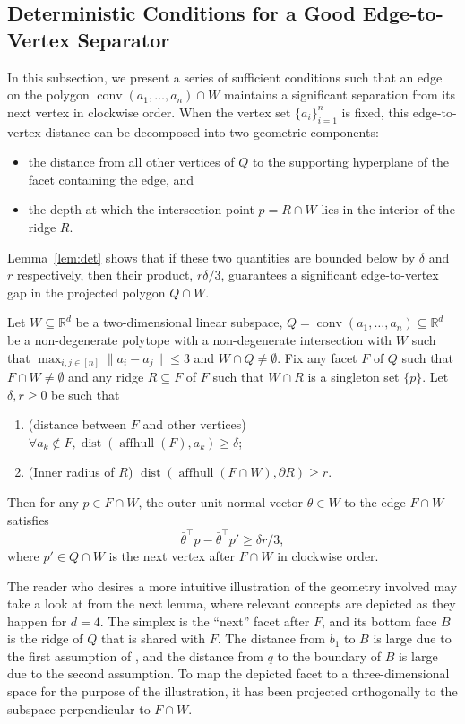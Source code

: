\documentclass{article}\usepackage[a4paper,margin=20mm]{geometry}
\newcommand{\R}{\mathbb R}
\newcommand{\T}{\top}
\newcommand{\aff}{\operatorname{affhull}}
\newcommand{\conv}{\operatorname{conv}}
\newcommand{\dist}{\operatorname{dist}}
\renewcommand{\subset}{\subseteq}
\begin{document}
\subsection{Deterministic Conditions for a Good Edge-to-Vertex Separator} \label{sub:det}


In this subsection, we present a series of sufficient conditions such that an edge on the polygon $\conv(a_1, \ldots, a_n) \cap W$ maintains a significant separation from its next vertex in clockwise order. When the vertex set $\{a_i\}_{i=1}^n$ is fixed, this edge-to-vertex distance can be decomposed into two geometric components:
\begin{itemize}
    \item the distance from all other vertices of $Q$ to the supporting hyperplane of the facet containing the edge, and
    \item the depth at which the intersection point $p = R \cap W$ lies in the interior of the ridge $R$.
\end{itemize}
Lemma~\ref{lem:det} shows that if these two quantities are bounded below by $\delta$ and $r$ respectively, then their product, $r\delta/3$, guarantees a significant edge-to-vertex gap in the projected polygon $Q \cap W$.



\begin{lemma}\label{lem:det}
Let $W \subset \R^d$ be a two-dimensional linear subspace,
$Q = \conv(a_1, \ldots, a_n) \subset \R^d$ be a non-degenerate polytope
with a non-degenerate intersection with $W$
such that $\max_{i, j\in [n]} \|a_i - a_j\| \leq 3$ and $W \cap Q \neq \emptyset$.
Fix any facet $F$ of $Q$ such that $F \cap W \neq \emptyset$
and any ridge $R \subset F$ of $F$ such that $W \cap R$ is a singleton set $\{p\}$.
Let $\delta, r \geq 0$ be such that
\begin{enumerate}
    \item (distance between $F$ and other vertices) $\forall a_k \notin F, \dist(\aff(F), a_k) \geq \delta$;
    \item (Inner radius of $R$) $\dist(\aff(F \cap W), \partial R) \geq r$.
\end{enumerate}
Then for any $p \in F \cap W$, the outer unit normal vector $\bar{\theta} \in W$
to the edge $F \cap W$ satisfies
\[
\bar{\theta}^\T p - \bar{\theta}^\top p' \geq \delta r/3,
\]
where $p' \in Q \cap W$ is the next vertex after $F \cap W$ in clockwise order.
\end{lemma}

The reader who desires a more intuitive illustration of the geometry involved
may take a look at  from the next lemma, where relevant concepts are depicted
as they happen for $d=4$. The simplex is the ``next'' facet after $F$, and its bottom face $B$
is the ridge of $Q$ that is shared with $F$.
The distance from $b_1$ to $B$ is large due to the first assumption of ,
and the distance from $q$ to the boundary of $B$ is large due to the second assumption.
To map the depicted facet to a three-dimensional space for the purpose of the illustration,
it has been projected orthogonally to the subspace perpendicular to $F \cap W$.
\end{document}
